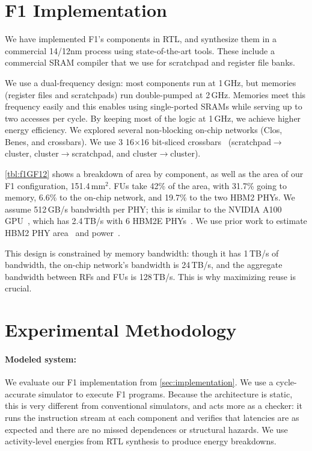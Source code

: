 \section{F1 Implementation}
\label{sec:f1implementation}

We have implemented F1's components in RTL, and synthesize them in a commercial
14/12nm process using state-of-the-art tools. These include a commercial SRAM
compiler that we use for scratchpad and register file banks.

We use a dual-frequency design: most components run at 1\,GHz, but memories
(register files and scratchpads) run double-pumped at 2\,GHz. Memories meet
this frequency easily and this enables using single-ported SRAMs while serving
up to two accesses per cycle. By keeping most of the logic at 1\,GHz, we
achieve higher energy efficiency. We explored several non-blocking on-chip
networks (Clos, Benes, and crossbars). We use 3 16$\times$16 bit-sliced
crossbars~\cite{passas:tocaid12:crossbar} (scratch\-pad$\rightarrow$cluster,
cluster$\rightarrow$scratchpad, and cluster$\rightarrow$cluster).

\autoref{tbl:f1GF12} shows a breakdown of area by component, as well as the
area of our F1 configuration, 151.4\,mm$^2$. FUs take 42\% of the area, with
31.7\% going to memory, 6.6\% to the on-chip network, and 19.7\% to the two
HBM2 PHYs. We assume 512\,GB/s bandwidth per PHY; this is similar to the NVIDIA
A100 GPU~\cite{choquette2021nvidia}, which has 2.4\,TB/s with 6 HBM2E
PHYs~\cite{nvidiadgx}. We use prior work to estimate HBM2 PHY
area~\cite{rambuswhite, dasgupta20208} and power~\cite{rambuswhite,
ge2011design}.

This design is constrained by memory bandwidth: though it has 1\,TB/s of
bandwidth, the on-chip network's bandwidth is 24\,TB/s, and the aggregate
bandwidth between RFs and FUs is 128\,TB/s. This is why maximizing reuse is
crucial.

\section{Experimental Methodology}
\label{sec:f1methodology}

\paragraph{Modeled system:}
We evaluate our F1 implementation from \autoref{sec:implementation}. We use a
cycle-accurate simulator to execute F1 programs. Because the architecture is
static, this is very different from conventional simulators, and acts more as a
checker: it runs the instruction stream at each component and verifies that
latencies are as expected and there are no missed dependences or structural
hazards. We use activity-level energies from RTL synthesis to produce energy
breakdowns.

